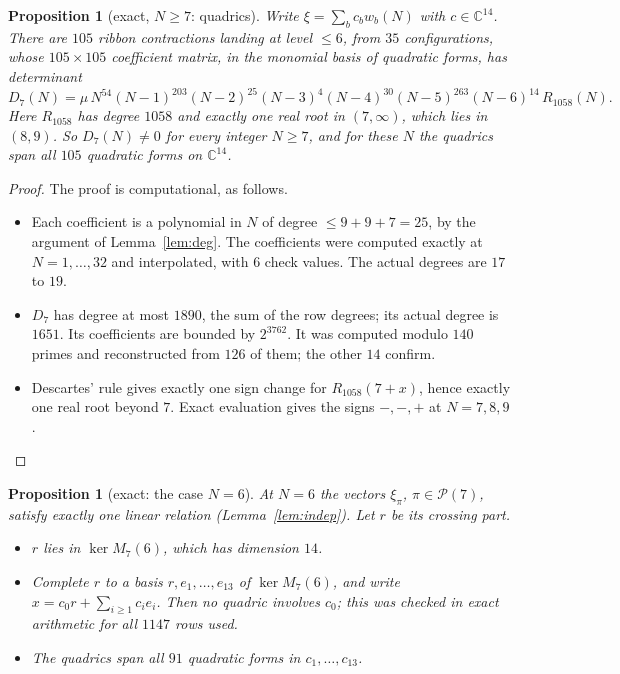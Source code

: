 \documentclass[11pt]{amsart}
\newtheorem{proposition}[theorem]{Proposition}
\theoremstyle{definition}
\theoremstyle{remark}
\theoremstyle{plain}
\numberwithin{equation}{section}
\numberwithin{table}{section}
\newcommand{\C}{\mathbb C}
\newcommand{\Pp}{\mathcal{P}}
\begin{document}
\begin{proposition}[exact, $N\ge7$: quadrics]\label{prop:quadseven}
Write $\xi=\sum_bc_bw_b(N)$ with $c\in\C^{14}$. There are $105$ ribbon contractions landing at level $\le6$, from $35$ configurations, whose $105\times105$ coefficient matrix, in the monomial basis of quadratic forms, has determinant
\[
D_7(N)=\mu\,N^{54}(N-1)^{203}(N-2)^{25}(N-3)^{4}(N-4)^{30}(N-5)^{263}(N-6)^{14}\,R_{1058}(N).
\]
Here $R_{1058}$ has degree $1058$ and exactly one real root in $(7,\infty)$, which lies in $(8,9)$. So $D_7(N)\ne0$ for every integer $N\ge7$, and for these $N$ the quadrics span all $105$ quadratic forms on $\C^{14}$.
\end{proposition}

\begin{proof}
The proof is computational, as follows.
\begin{itemize}
\item Each coefficient is a polynomial in $N$ of degree $\le9+9+7=25$, by the argument of Lemma~\ref{lem:deg}. The coefficients were computed exactly at $N=1,\dots,32$ and interpolated, with $6$ check values. The actual degrees are $17$ to $19$.
\item $D_7$ has degree at most $1890$, the sum of the row degrees; its actual degree is $1651$. Its coefficients are bounded by $2^{3762}$. It was computed modulo $140$ primes and reconstructed from $126$ of them; the other $14$ confirm.
\item Descartes' rule gives exactly one sign change for $R_{1058}(7+x)$, hence exactly one real root beyond $7$. Exact evaluation gives the signs $-,-,+$ at $N=7,8,9$. \qedhere
\end{itemize}
\end{proof}

\begin{proposition}[exact: the case $N=6$]\label{prop:sixseven}
At $N=6$ the vectors $\xi_\pi$, $\pi\in\Pp(7)$, satisfy exactly one linear relation (Lemma~\ref{lem:indep}). Let $r$ be its crossing part.
\begin{itemize}
\item $r$ lies in $\ker M_7(6)$, which has dimension $14$.
\item Complete $r$ to a basis $r,e_1,\dots,e_{13}$ of $\ker M_7(6)$, and write $x=c_0r+\sum_{i\ge1}c_ie_i$. Then no quadric involves $c_0$; this was checked in exact arithmetic for all $1147$ rows used.
\item The quadrics span all $91$ quadratic forms in $c_1,\dots,c_{13}$.
\end{itemize}
\end{proposition}
\end{document}
